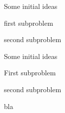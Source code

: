 \documentclass[12pt]{simple-assignment}
\begin{document}
\begin{problem}
    Some initial ideas
    \begin{subproblem}
        first subproblem
    \end{subproblem}
    \begin{subproblem}
        second subproblem
    \end{subproblem}
\end{problem}

\begin{problem}
    Some initial ideas
    \begin{subproblem}
        First subproblem
    \end{subproblem}
    \begin{subproblem}
        second subproblem
    \end{subproblem}
\end{problem}

\begin{problem}
    bla
\end{problem}
\end{document}
